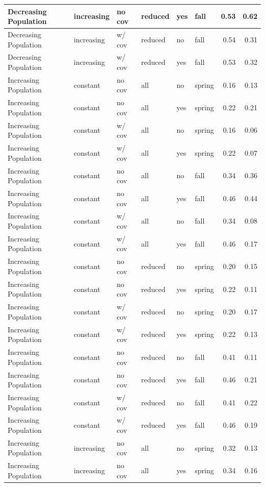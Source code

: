 \documentclass[
]{article}
\begin{document}
\begin{tabular}{l|l|l|l|l|l|r|r}
\hline
Decreasing Population & increasing & no cov & reduced & yes & fall & 0.53 & 0.62\\
\hline
Decreasing Population & increasing & w/ cov & reduced & no & fall & 0.54 & 0.31\\
\hline
Decreasing Population & increasing & w/ cov & reduced & yes & fall & 0.53 & 0.32\\
\hline
Increasing Population & constant & no cov & all & no & spring & 0.16 & 0.13\\
\hline
Increasing Population & constant & no cov & all & yes & spring & 0.22 & 0.21\\
\hline
Increasing Population & constant & w/ cov & all & no & spring & 0.16 & 0.06\\
\hline
Increasing Population & constant & w/ cov & all & yes & spring & 0.22 & 0.07\\
\hline
Increasing Population & constant & no cov & all & no & fall & 0.34 & 0.36\\
\hline
Increasing Population & constant & no cov & all & yes & fall & 0.46 & 0.44\\
\hline
Increasing Population & constant & w/ cov & all & no & fall & 0.34 & 0.08\\
\hline
Increasing Population & constant & w/ cov & all & yes & fall & 0.46 & 0.17\\
\hline
Increasing Population & constant & no cov & reduced & no & spring & 0.20 & 0.15\\
\hline
Increasing Population & constant & no cov & reduced & yes & spring & 0.22 & 0.11\\
\hline
Increasing Population & constant & w/ cov & reduced & no & spring & 0.20 & 0.17\\
\hline
Increasing Population & constant & w/ cov & reduced & yes & spring & 0.22 & 0.13\\
\hline
Increasing Population & constant & no cov & reduced & no & fall & 0.41 & 0.11\\
\hline
Increasing Population & constant & no cov & reduced & yes & fall & 0.46 & 0.21\\
\hline
Increasing Population & constant & w/ cov & reduced & no & fall & 0.41 & 0.22\\
\hline
Increasing Population & constant & w/ cov & reduced & yes & fall & 0.46 & 0.19\\
\hline
Increasing Population & increasing & no cov & all & no & spring & 0.32 & 0.13\\
\hline
Increasing Population & increasing & no cov & all & yes & spring & 0.34 & 0.16\\

\end{tabular}
\end{document}
